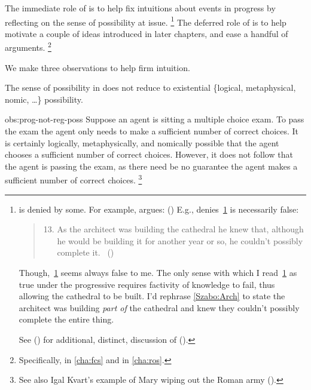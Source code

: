 \begin{note}
  The immediate role of \assuPP{} is to help fix intuitions about events in progress by reflecting on the sense of possibility at issue.%
  \footnote{
     is denied by some.
    For example, \citeauthor{Szabo:2004ul} argues:
    (\citeyear[40]{Szabo:2004ul})
    E.g., \citeauthor{Szabo:2004ul} denies~\ref{Szabo:Arch} is necessarily false:
    \begin{quote}
      \begin{enumerate}[label=(\arabic*), ref=(\arabic*)]
        \setcounter{enumi}{12}
      \item
        \label{Szabo:Arch}
        As the architect was building the cathedral he knew that, although he would be building it for another year or so, he couldn't possibly complete it.%
        \mbox{ }\hfill\mbox{(\citeyear[38]{Szabo:2004ul})}
      \end{enumerate}
    \end{quote}
    Though,~\ref{Szabo:Arch} seems always false to me.
    The only sense with which I read~\ref{Szabo:Arch} as true under the progressive requires factivity of knowledge to fail, thus allowing the cathedral to be built.
    I'd rephrase \autoref{Szabo:Arch} to state the architect was building \emph{part of} the cathedral and knew they couldn't possibly complete the entire thing.

    See (\cite[1245]{Portner:2011vi}) for additional, distinct, discussion of (\cite{Szabo:2004ul}).
  }
  The deferred role of \assuPP{} is to help motivate a couple of ideas introduced in later chapters, and ease a handful of arguments.%
  \footnote{
    Specifically,  in \autoref{cha:fcs} and  in \autoref{cha:ros}.
  }

  We make three observations to help firm intuition.

  \begin{observation}%
    \label{obs:prog-not-reg-poss}%
    The sense of possibility in \assuPP{} does not reduce to existential \{logical, metaphysical, nomic, \dots\} possibility.
  \end{observation}
  \begin{motivation}{obs:prog-not-reg-poss}
    Suppose an agent is sitting a multiple choice exam.
    To pass the exam the agent only needs to make a sufficient number of correct choices.
    It is certainly logically, metaphysically, and nomically possible that the agent chooses a sufficient number of correct choices.
    However, it does not follow that the agent is passing the exam, as there need be no guarantee the agent makes a sufficient number of correct choices.%
    \footnote{
      See also Igal Kvart's example of Mary wiping out the Roman army (\cite[18]{Landman:1992wh}).
    }
  \end{motivation}


\end{note}
